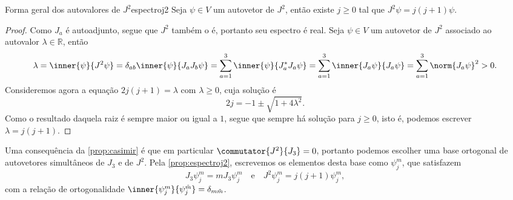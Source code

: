 \begin{proposition}{Forma geral dos autovalores de \(J^2\)}{espectroj2}
    Seja \(\psi \in V\) um autovetor de \(J^2\), então existe \(j \geq 0\) tal que \(J^2 \psi = j(j+1) \psi\).
\end{proposition}
\begin{proof}
    Como \(J_a\) é autoadjunto, segue que \(J^2\) também o é, portanto seu espectro é real. Seja \(\psi \in V\) um autovetor de \(J^2\) associado ao autovalor \(\lambda \in \mathbb{R}\), então
    \begin{equation*}
        \lambda = \inner{\psi}{J^2\psi} = \delta_{ab}\inner{\psi}{J_a J_b \psi}  = \sum_{a = 1}^3\inner{\psi}{J_a^* J_a\psi} = \sum_{a = 1}^3 \inner{J_a \psi}{J_a \psi} = \sum_{a = 1}^3{\norm{J_a \psi}}^2> 0.
    \end{equation*}
    Consideremos agora a equação \(2j(j+1) = \lambda\) com \(\lambda \geq 0\), cuja solução é
    \begin{equation*}
        2 j = -1 \pm \sqrt{1 + 4 \lambda^2}.
    \end{equation*}
    Como o resultado daquela raiz é sempre maior ou igual a \(1\), segue que sempre há solução para \(j \geq 0\), isto é, podemos escrever \(\lambda = j(j+1)\).
\end{proof}

Uma consequência da \cref{prop:casimir} é que em particular \(\commutator{J^2}{J_3} = 0\), portanto podemos escolher uma base ortogonal de autovetores simultâneos de \(J_3\) e de \(J^2\). Pela \cref{prop:espectroj2}, escrevemos os elementos desta base como \(\psi_j^m\), que satisfazem
\begin{equation*}
    J_3 \psi_{j}^{m} = m J_3 \psi_{j}^m\quad\text{e}\quad J^2 \psi_{j}^{m} = j(j+1) \psi_{j}^m,
\end{equation*}
com a relação de ortogonalidade \(\inner{\psi_{j}^{m}}{\psi_{j}^{\tilde{m}}} = \delta_{m\tilde{m}}\).

